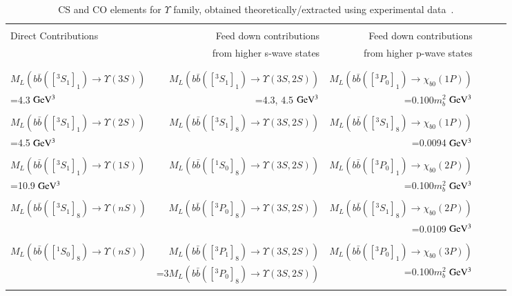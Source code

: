 \documentclass[review]{elsarticle}
\begin{document}
\normalsize
\begin{table}
  \centering
  \caption{CS and CO elements for $\Upsilon$ family, obtained theoretically/extracted using experimental data~\cite{Sharma:2012dy,Feng:2015wka}.}
  \footnotesize
  \begin{tabular*}{\textwidth}{@{\extracolsep{\fill}}lrrrrl@{}}
    \hline
    \hline
    & & \\ 
    Direct Contributions & Feed down contributions & Feed down contributions \\
    & from higher s-wave states & from higher p-wave states \\ \\
    \hline 
    & & \\
    $M_L(b\bar{b}([^3S_1]_1)\rightarrow\Upsilon(3S))$ & $M_L(b\bar{b}([^3S_1]_1)\rightarrow\Upsilon(3S,2S))$
    & $M_L(b\bar{b}([^3P_0]_1)\rightarrow\chi_{b0}(1P))$ \\
    =4.3 ${\rm GeV^3}$ & =4.3, 4.5 ${\rm GeV^3}$ & =0.100$m_b^2$ ${\rm GeV^3}$ \\ \\
    
    $M_L(b\bar{b}([^3S_1]_1)\rightarrow\Upsilon(2S))$ & $M_L(b\bar{b}([^3S_1]_8)\rightarrow\Upsilon(3S,2S))$
    & $M_L(b\bar{b}([^3S_1]_8)\rightarrow\chi_{b0}(1P))$ \\
    =4.5 ${\rm GeV^3}$ & & =0.0094 ${\rm GeV^3}$ \\ \\
    
    $M_L(b\bar{b}([^3S_1]_1)\rightarrow\Upsilon(1S))$ & $M_L(b\bar{b}([^1S_0]_8)\rightarrow\Upsilon(3S,2S))$
    & $M_L(b\bar{b}([^3P_0]_1)\rightarrow\chi_{b0}(2P))$ \\
    =10.9 ${\rm GeV^3}$ &  & =0.100$m_b^2$ ${\rm GeV^3}$ \\ \\
    
    $M_L(b\bar{b}([^3S_1]_8)\rightarrow\Upsilon(nS))$ & $M_L(b\bar{b}([^3P_0]_8)\rightarrow\Upsilon(3S,2S))$
    & $M_L(b\bar{b}([^3S_1]_8)\rightarrow\chi_{b0}(2P))$ \\
    &  & =0.0109 ${\rm GeV^3}$ \\ \\
    
    $M_L(b\bar{b}([^1S_0]_8)\rightarrow\Upsilon(nS))$ & $M_L(b\bar{b}([^3P_1]_8)\rightarrow\Upsilon(3S,2S))$ &$M_L(b\bar{b}([^3P_0]_1)\rightarrow\chi_{b0}(3P))$ \\
    & =3$M_L(b\bar{b}([^3P_0]_8)\rightarrow\Upsilon(3S,2S))$ &=0.100$m_b^2$ ${\rm GeV^3}$  \\ \\
    

\end{tabular*}
\end{table}
\end{document}
